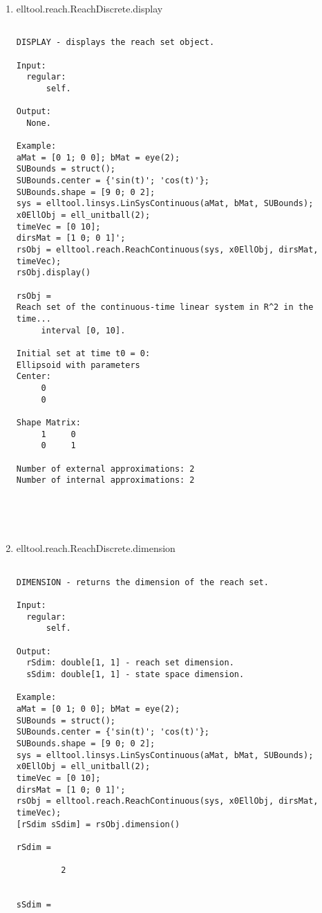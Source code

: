 \begin{enumerate}
\begin{lstlisting}
\end{lstlisting}
\fontfamily{\familydefault}
\selectfont
\item {elltool.reach.ReachDiscrete.display}
\selectfont
\begin{lstlisting}

DISPLAY - displays the reach set object.

Input:
  regular:
      self.

Output:
  None.

Example:
aMat = [0 1; 0 0]; bMat = eye(2);
SUBounds = struct();
SUBounds.center = {'sin(t)'; 'cos(t)'};
SUBounds.shape = [9 0; 0 2];
sys = elltool.linsys.LinSysContinuous(aMat, bMat, SUBounds);
x0EllObj = ell_unitball(2);
timeVec = [0 10];
dirsMat = [1 0; 0 1]';
rsObj = elltool.reach.ReachContinuous(sys, x0EllObj, dirsMat, timeVec);
rsObj.display()

rsObj =
Reach set of the continuous-time linear system in R^2 in the time...
     interval [0, 10].

Initial set at time t0 = 0:
Ellipsoid with parameters
Center:
     0
     0

Shape Matrix:
     1     0
     0     1

Number of external approximations: 2
Number of internal approximations: 2





\end{lstlisting}
\fontfamily{\familydefault}
\selectfont
\item {elltool.reach.ReachDiscrete.dimension}
\selectfont
\begin{lstlisting}

DIMENSION - returns the dimension of the reach set.

Input:
  regular:
      self.

Output:
  rSdim: double[1, 1] - reach set dimension.
  sSdim: double[1, 1] - state space dimension.

Example:
aMat = [0 1; 0 0]; bMat = eye(2);
SUBounds = struct();
SUBounds.center = {'sin(t)'; 'cos(t)'};
SUBounds.shape = [9 0; 0 2];
sys = elltool.linsys.LinSysContinuous(aMat, bMat, SUBounds);
x0EllObj = ell_unitball(2);
timeVec = [0 10];
dirsMat = [1 0; 0 1]';
rsObj = elltool.reach.ReachContinuous(sys, x0EllObj, dirsMat, timeVec);
[rSdim sSdim] = rsObj.dimension()

rSdim =

         2


sSdim =


\end{lstlisting}
\end{enumerate}
